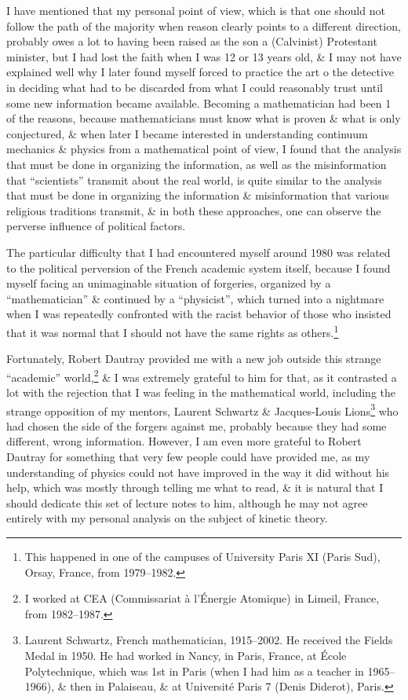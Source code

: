 \documentclass{article}
\begin{document}
\begin{enumerate}
	I have mentioned that my personal point of view, which is that one should not follow the path of the majority when reason clearly points to a different direction, probably owes a lot to having been raised as the son a (Calvinist) Protestant minister, but I had lost the faith when I was 12 or 13 years old, \& I may not have explained well why I later found myself forced to practice the art o the detective in deciding what had to be discarded from what I could reasonably trust until some new information became available. Becoming a mathematician had been 1 of the reasons, because mathematicians must know what is proven \& what is only conjectured, \& when later I became interested in understanding continuum mechanics \& physics from a mathematical point of view, I found that the analysis that must be done in organizing the information, as well as the misinformation that ``scientists'' transmit about the real world, is quite similar to the analysis that must be done in organizing the information \& misinformation that various religious traditions transmit, \& in both these approaches, one can observe the perverse influence of political factors.
	
	The particular difficulty that I had encountered myself around 1980 was related to the political perversion of the French academic system itself, because I found myself facing an unimaginable situation of forgeries, organized by a ``mathematician'' \& continued by a ``physicist'', which turned into a nightmare when I was repeatedly confronted with the racist behavior of those who insisted that it was normal that I should not have the same rights as others.\footnote{This happened in one of the campuses of University Paris XI (Paris Sud), Orsay, France, from 1979--1982.}
	
	Fortunately, {\sc Robert Dautray} provided me with a new job outside this strange ``academic'' world,\footnote{I worked at CEA (Commissariat à l'\'Energie Atomique) in Limeil, France, from 1982--1987.} \& I was extremely grateful to him for that, as it contrasted a lot with the rejection that I was feeling in the mathematical world, including the strange opposition of my mentors, {\sc Laurent Schwartz \& Jacques-Louis Lions}\footnote{{\sc Laurent Schwartz}, French mathematician, 1915--2002. He received the Fields Medal in 1950. He had worked in Nancy, in Paris, France, at \'Ecole Polytechnique, which was 1st in Paris (when I had him as a teacher in 1965--1966), \& then in Palaiseau, \& at Université Paris 7 (Denis Diderot), Paris.} who had chosen the side of the forgers against me, probably because they had some different, wrong information. However, I am even more grateful to {\sc Robert Dautray} for something that very few people could have provided me, as my understanding of physics could not have improved in the way it did without his help, which was mostly through telling me what to read, \& it is natural that I should dedicate this set of lecture notes to him, although he may not agree entirely with my personal analysis on the subject of kinetic theory.
	

\end{enumerate}
\end{document}
